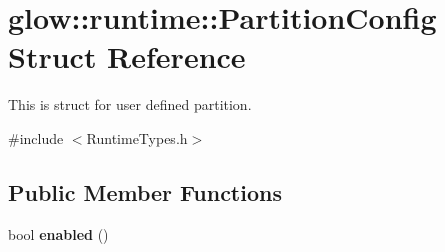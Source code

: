 \hypertarget{structglow_1_1runtime_1_1_partition_config}{}\section{glow\+:\+:runtime\+:\+:Partition\+Config Struct Reference}
\label{structglow_1_1runtime_1_1_partition_config}


This is struct for user defined partition.  




{\ttfamily \#include $<$Runtime\+Types.\+h$>$}

\subsection*{Public Member Functions}
\begin{DoxyCompactItemize}
\item 
\mbox{\label{structglow_1_1runtime_1_1_partition_config_a626f95eccbc00d3464c0352e6a5f8709}} 
bool {\bfseries enabled} ()
\end{DoxyCompactItemize}
